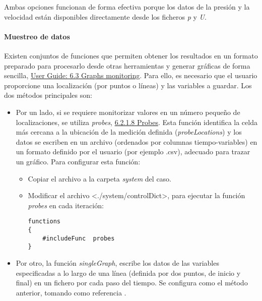 Ambas opciones funcionan de forma efectiva porque los datos de la
presión y la velocidad están disponibles directamente desde los ficheros
\emph{p} y \emph{U}.

\paragraph{Muestreo de datos}\label{header-n458}

Existen conjuntos de funciones que permiten obtener los resultados en un
formato preparado para procesarlo desde otras herramientas y generar
gráficas de forma sencilla,
\href{http://cfd.direct/openfoam/user-guide/graphs-monitoring/}{User
Guide: 6.3 Graphs monitoring}. Para ello, es necesario que el usuario
proporcione una localización (por puntos o líneas) y las variables a
guardar. Los dos métodos principales son:

\begin{itemize}
\item
  Por un lado, si se requiere monitorizar valores en un número pequeño
  de localizaciones, se utiliza \emph{probes},
  \href{http://cfd.direct/openfoam/user-guide/post-processing-cli/\#x31-2360006.2.1.8}{6.2.1.8
  Probes}. Esta función identifica la celda más cercana a la ubicación
  de la medición definida (\emph{probeLocations}) y los datos se
  escriben en un archivo (ordenados por columnas tiempo-variables) en un
  formato definido por el usuario (por ejemplo .csv), adecuado para
  trazar un gráfico. Para configurar esta función:

  \begin{itemize}
  \item
    Copiar el archivo a la carpeta \emph{system} del caso.
  \item
    Modificar el archivo \textless{}./system/controlDict\textgreater{},
    para ejecutar la función \emph{probes} en cada iteración:

\begin{verbatim}
functions
{
    #includeFunc  probes
}
\end{verbatim}
  \end{itemize}
\item
  Por otro, la función \emph{singleGraph}, escribe los datos de las
  variables especificadas a lo largo de una línea (definida por dos
  puntos, de inicio y final) en un fichero por cada paso del tiempo. Se
  configura como el método anterior, tomando como referencia .
\end{itemize}


